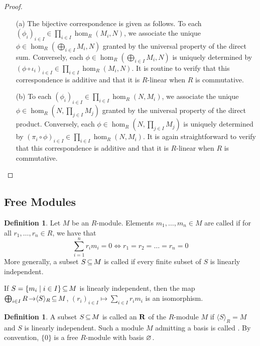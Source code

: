 \documentclass[11pt]{book}
\theoremstyle{definition}   \newtheorem{defn}[counter]{Definition} %
\newtheorem*{defn*}{Definition}
\newcommand{\gen}[1]{\langle #1 \rangle}   \newcommand{\stab}[2]{\tn{Stab}_{#1}(#2)}   \newcommand{\fix}[2]{\tn{Fix}_{#1}(#2)}   \newcommand{\op}{^{\tn{op}}}
\DeclareMathOperator{\ra}{\rightarrow}   \DeclareMathOperator{\Poly}{\mathbf{P}}   \DeclareMathOperator{\spn}{\textnormal{span}}   \DeclareMathOperator{\aut}{\textnormal{Aut}}
\newcommand{\vs}{\vspace{8pt}}
\numberwithin{counter}{chapter}
\begin{document}
\begin{proof}\
\begin{enumerate}
\item[(a)] The bijective correspondence is given as follows. To each $(\phi_i)_{i \in I} \in \prod_{i \in I} \hom_R(M_i,N)$, we associate the unique $\phi \in \hom_R(\bigoplus_{i \in I} M_i,N)$ granted by the universal property of the direct sum. Conversely, each $\phi \in \hom_R(\bigoplus_{i \in I} M_i,N)$ is uniquely determined by $(\phi \circ \iota_i)_{i \in I} \in \prod_{i \in I} \hom_R(M_i,N)$. It is routine to verify that this correspondence is additive and that it is $R$-linear when $R$ is commutative.

\item[(b)] To each $(\phi_i)_{i \in I} \in \prod_{i \in I} \hom_R(N,M_i)$, we associate the unique $\phi \in \hom_R(N,\prod_{j \in I} M_j)$ granted by the universal property of the direct product. Conversely, each $\phi \in  \hom_R(N,\prod_{j \in I} M_j)$ is uniquely determined by $(\pi_i \circ \phi)_{i \in I} \in \prod_{i \in I} \hom_R(N,M_i)$. It is again straightforward to verify that this correspondence is additive and that it is $R$-linear when $R$ is commutative.
\end{enumerate}
\end{proof}

\vs

\subsection*{Free Modules}

\vs

\begin{defn*}
Let $M$ be an $R$-module. Elements $m_1,\dots,m_n \in M$ are called  if for all $r_1,\dots,r_n \in R$, we have that
	\[\sum_{i = 1}^n r_i m_i = 0 \iff r_1 = r_2 = \dots = r_n = 0 \]
More generally, a subset $S \operatorname{\subseteq} M$ is called  if every finite subset of $S$ is linearly independent.
\end{defn*}

\vs

\begin{remark}
If $S = \{m_i \mid i \in I\} \operatorname{\subseteq} M$ is linearly independent, then the map $\bigoplus_{i \in I} R \ra \gen{S}_R \sub M$, $(r_i)_{i \in I} \mapsto \sum_{i \in I} r_i m_i$ is an isomorphism.
\end{remark}

\vs

\begin{defn}
A subset $S \operatorname{\subseteq} M$ is called an $\mathbf{R}$ of the $R$-module $M$ if $\gen{S}_R = M$ and $S$ is linearly independent. Such a module $M$ admitting a basis is called . By convention, $\{0\}$ is a free $R$-module with basis $\varnothing$.
\end{defn}
\end{document}
